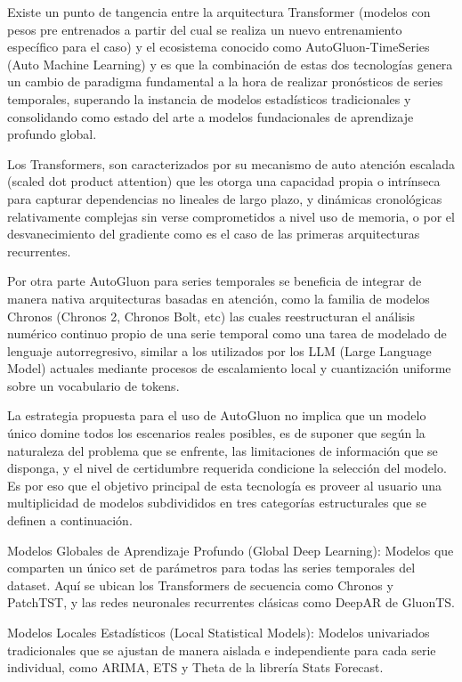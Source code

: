 Existe un punto de tangencia entre la arquitectura Transformer (modelos con pesos pre entrenados a partir del cual se realiza un nuevo entrenamiento específico para el caso) y el ecosistema conocido como AutoGluon-TimeSeries (Auto Machine Learning) y es que la combinación de estas dos tecnologías genera un cambio de paradigma fundamental a la hora de realizar pronósticos de series temporales, superando la instancia de modelos estadísticos tradicionales y consolidando como estado del arte a modelos fundacionales de aprendizaje profundo global.

Los Transformers, son caracterizados por su mecanismo de auto atención escalada (scaled dot product attention) que les otorga una capacidad propia o intrínseca para capturar dependencias no lineales de largo plazo, y dinámicas cronológicas relativamente complejas sin verse comprometidos a nivel uso de memoria, o por el desvanecimiento del gradiente como es el caso de las primeras arquitecturas recurrentes.

Por otra parte AutoGluon para series temporales se beneficia de integrar de manera nativa arquitecturas basadas en atención, como la familia de modelos Chronos (Chronos 2, Chronos Bolt, etc) las cuales reestructuran el análisis numérico continuo propio de una serie temporal como una tarea de modelado de lenguaje autorregresivo, similar a los utilizados por los LLM (Large Language Model) actuales mediante procesos de escalamiento local y cuantización uniforme sobre un vocabulario de tokens.

La estrategia propuesta para el uso de AutoGluon no implica que un modelo único domine todos los escenarios reales posibles, es de suponer que según la naturaleza del problema que se enfrente, las limitaciones de información que se disponga, y el nivel de certidumbre requerida condicione la selección del modelo. Es por eso que el objetivo principal de esta tecnología es proveer al usuario una multiplicidad de modelos subdivididos en tres categorías estructurales que se definen a continuación.

Modelos Globales de Aprendizaje Profundo (Global Deep Learning): Modelos que comparten un único set de parámetros para todas las series temporales del dataset. Aquí se ubican los Transformers de secuencia como Chronos y PatchTST, y las redes neuronales recurrentes clásicas como DeepAR de GluonTS.

Modelos Locales Estadísticos (Local Statistical Models): Modelos univariados tradicionales que se ajustan de manera aislada e independiente para cada serie individual, como ARIMA, ETS y Theta de la librería Stats Forecast.

